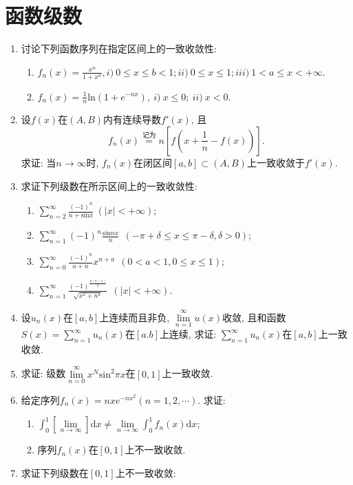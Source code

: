 \section{函数级数}
\begin{enumerate}
	\item 讨论下列函数序列在指定区间上的一致收敛性:
	\begin{enumerate}
		\item $f_n(x)=\frac{x^n}{1+x^n}, i)\ 0\le x\le b<1;ii)\ 0\le x\le 1;iii)\ 1<a\le x<+\infty$.
		\item $f_n(x)=\frac{1}{n}\mathrm{ln}(1+e^{-nx}),\ i)\ x\le 0;\ ii)\ x<0$.
	\end{enumerate}
\item 设$f(x)$在$(A,B)$内有连续导数$f'(x)$, 且$$
f_n(x)\overset{\text{记为}}{=}n[f(x+\frac{1}{n}-f(x))].$$
求证: 当$n\rightarrow \infty$时, $f_n(x)$在闭区间$[a,b]\subset(A,B)$上一致收敛于$f'(x)$.
\item 求证下列级数在所示区间上的一致收敛性:
\begin{enumerate}
	\item $\sum\limits_{n=2}^{\infty}\frac{(-1)^n}{n+\mathrm{sin}x}\ (|x|<+\infty)$;
	\item $\sum\limits_{n=1}^{\infty}(-1)^n\frac{\mathrm{sin}nx}{n}\ \ (-\pi+\delta\le x\le \pi-\delta,\delta>0)$;
	\item $\sum\limits_{n=0}^{\infty}\frac{(-1)^n}{a+n}x^{n+a}\ \ (0<a<1,0\le x\le 1)$;
	\item $\sum\limits_{n=1}^{\infty}\frac{(-1)^\frac{n(n-1)}{2}}{\sqrt{x^2+n^2}}\ \ (|x|<+\infty)$.
\end{enumerate}
\item 设$u_n(x)$在$[a,b]$上连续而且非负, $\lim\limits_{n=1}^{\infty}u(x)$收敛, 且和函数$S(x)=\sum\limits_{n=1}^{\infty}u_n(x)$在$[a.b]$上连续, 求证: $\sum\limits_{n=1}^{\infty}u_n(x)$在$[a,b]$上一致收敛.
\item 求证: 级数$\lim\limits_{n=0}^{\infty}x^N\mathrm{sin}^2\pi x$在$[0,1]$上一致收敛.
\item 给定序列$f_n(x)=nxe^{-nx^2} (n=1,2,\cdots)$. 求证:
\begin{enumerate}
	\item $\displaystyle{\int_{0}^{1}[\lim\limits_{n\rightarrow \infty}]\mathrm{d}x\ne \lim\limits_{n\rightarrow \infty}\int_{0}^{1}f_n(x)\mathrm{d}x}$;
	\item 序列$f_n(x)$在$[0,1]$上不一致收敛.
\end{enumerate}
\item 求证下列级数在$[0,1]$上不一致收敛:

\end{enumerate}
